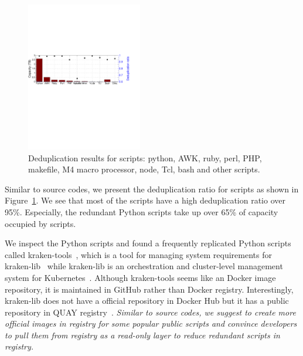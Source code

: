 \begin{figure}
	\centering
	\includegraphics[width=0.45\textwidth]{graphs/dedup-scrp}
	\caption{Deduplication results for scripts: python, AWK, ruby, perl, PHP, makefile, M4 macro processor, node, Tcl, bash and other scripts.
	}
	\label{fig:dedup-scrp}
\end{figure}

Similar to source codes, we present the deduplication ratio for scripts as shown in
Figure~\ref{fig:dedup-scrp}.
We see that most of the scripts have a high deduplication ratio over 95\%. Especially, the redundant Python scripts take up over 65\% of capacity occupied by scripts. 

We inspect the Python scripts and found a frequently replicated Python scripts called kraken-tools~\cite{xxx}, which is a tool for managing system requirements for kraken-lib~\cite{xxx} while kraken-lib is an orchestration and cluster-level management system for Kubernetes~\cite{xxx}.
Although kraken-tools seems like an Docker image repository, it is maintained in GitHub rather than Docker registry. Interestingly, kraken-lib does not have a official repository in Docker Hub but it has a public repository in QUAY registry~\cite{xxx}.
\textit{Similar to source codes, we suggest to create more official images in registry for some popular public scripts %
and convince developers to pull them from registry as a read-only layer to reduce redundant scripts in registry.}

